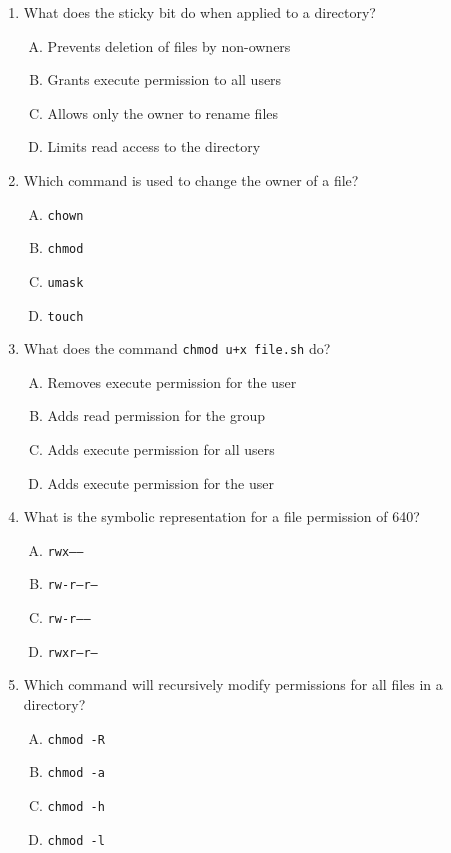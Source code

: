 \documentclass[a4paper]{report}
\begin{document}
\begin{enumerate}[1.]
    \item What does the sticky bit do when applied to a directory?  
    \begin{enumerate}[A)]
        \item Prevents deletion of files by non-owners  
        \item Grants execute permission to all users  
        \item Allows only the owner to rename files  
        \item Limits read access to the directory  
    \end{enumerate}

    \item Which command is used to change the owner of a file?  
    \begin{enumerate}[A)]
        \item \texttt{chown}  
        \item \texttt{chmod}  
        \item \texttt{umask}  
        \item \texttt{touch}  
    \end{enumerate}

    \item What does the command \texttt{chmod u+x file.sh} do?  
    \begin{enumerate}[A)]
        \item Removes execute permission for the user  
        \item Adds read permission for the group  
        \item Adds execute permission for all users  
        \item Adds execute permission for the user  
    \end{enumerate}

    \item What is the symbolic representation for a file permission of 640?  
    \begin{enumerate}[A)]
        \item \texttt{rwx------}  
        \item \texttt{rw-r--r--}  
        \item \texttt{rw-r-----}  
        \item \texttt{rwxr--r--}  
    \end{enumerate}

    \item Which command will recursively modify permissions for all files in a directory?  
    \begin{enumerate}[A)]
        \item \texttt{chmod -R}  
        \item \texttt{chmod -a}  
        \item \texttt{chmod -h}  
        \item \texttt{chmod -l}  
    \end{enumerate}


\end{enumerate}
\end{document}
